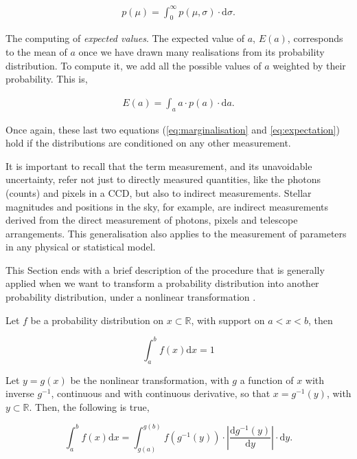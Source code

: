 \begin{align}
\label{eq:marginalisation}
p(\mu)=\int_0^{\infty} p(\mu,\sigma)\cdot \mathrm{d}\sigma.
\end{align}

The computing of \emph{expected values}. The expected value of $a$, $E(a)$, corresponds to the mean of $a$ once we have drawn many realisations from its probability distribution. To compute it, we add all the possible values of $a$ weighted by their probability. This is,

\begin{align}
\label{eq:expectation}
E(a)=\int_a a\cdot p(a)\cdot \mathrm{d}a.
\end{align}

Once again, these last two equations (\ref{eq:marginalisation} and \ref{eq:expectation}) hold if the distributions are conditioned on any other measurement.

It is important to recall that the term measurement, and its unavoidable uncertainty, refer not just to directly measured quantities, like the photons (counts) and pixels in a CCD, but also to indirect measurements. Stellar magnitudes and positions in the sky, for example, are indirect measurements derived from the direct measurement of photons, pixels and telescope arrangements. This generalisation also applies to the measurement of parameters in any physical or statistical model.%


This Section ends with a brief description of the procedure that is generally applied when we want to transform a probability distribution into another probability distribution, under a nonlinear transformation \cite[for more details see for example][pages 18 and 19]{Bishop2006}. 

Let  $f$ be a probability distribution on $x\subset\mathbb{R}$, with support on $a<x<b$, then

\begin{equation}
\int_a^b f(x) \mathrm{d}x = 1 \nonumber
\end{equation}

Let $y=g(x)$ be the nonlinear transformation, with $g$ a function of $x$ with inverse $g^{-1}$, continuous and with continuous derivative, so that $x=g^{-1}(y)$, with $y\subset \mathbb{R}$. Then, the following is true,

\begin{equation}
\label{eq:transformdistribution}
\int_a^b f(x) \mathrm{d}x = \int_{g(a)}^{g(b)} f(g^{-1}(y))\cdot \left|\frac{\mathrm{d}g^{-1}(y)}{\mathrm{d}y}\right|\cdot \mathrm{d}y.
\end{equation}

